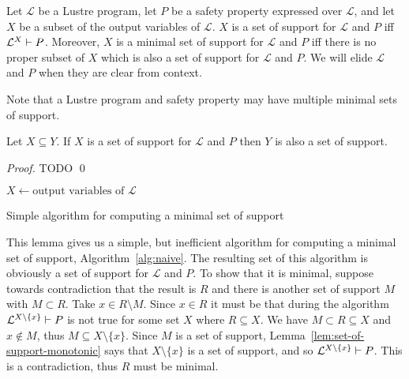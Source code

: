\begin{definition}
  \label{def:set-of-support}
  Let $\mathcal{L}$ be a Lustre program, let $P$ be a safety property
  expressed over $\mathcal{L}$, and let $X$ be a subset of the output
  variables of $\mathcal{L}$. $X$ is a set of support for
  $\mathcal{L}$ and $P$ iff $\mathcal{L}^{X}\vdash P$. Moreover,
  $X$ is a minimal set of support for $\mathcal{L}$ and $P$ iff there
  is no proper subset of $X$ which is also a set of support for
  $\mathcal{L}$ and $P$. We will elide $\mathcal{L}$ and $P$ when they
  are clear from context.
\end{definition}

Note that a Lustre program and safety property may have multiple
minimal sets of support.

\begin{lemma}
  \label{lem:set-of-support-monotonic}
  Let $X \subseteq Y$. If $X$ is a set of support for $\mathcal{L}$
  and $P$ then $Y$ is also a set of support.
\end{lemma}
\begin{proof}
  TODO \qed
\end{proof}


\begin{algorithm}
\label{alg:naive}
  \BlankLine
  $X \leftarrow \mbox{output variables of $\mathcal{L}$}$ \\
   {
  }
\caption{Simple algorithm for computing a minimal set of support}
\end{algorithm}

This lemma gives us a simple, but inefficient algorithm for computing
a minimal set of support, Algorithm~\ref{alg:naive}. The resulting set
of this algorithm is obviously a set of support for $\mathcal{L}$ and
$P$. To show that it is minimal, suppose towards contradiction that
the result is $R$ and there is another set of support $M$ with $M
\subset R$. Take $x \in R\setminus M$. Since $x \in R$ it must be that
during the algorithm $\mathcal{L}^{X\setminus \{x\}}\vdash P$ is
not true for some set $X$ where $R \subseteq X$. We have $M \subset R
\subseteq X$ and $x\not\in M$, thus $M \subseteq X\setminus \{x\}$.
Since $M$ is a set of support,
Lemma~\ref{lem:set-of-support-monotonic} says that $X\setminus \{x\}$
is a set of support, and so $\mathcal{L}^{X\setminus
  \{x\}}\vdash P$. This is a contradiction, thus $R$ must be minimal.


